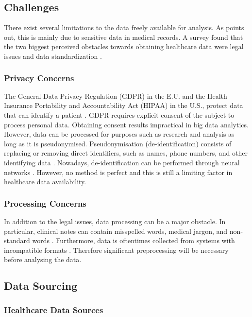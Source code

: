 \documentclass[a4paper,12pt]{article}
\begin{document}
\subsection{Challenges}

There exist several limitations to the data freely available for analysis.
As \textcite[2]{Dalianis2015} points out, this is mainly due to sensitive data
in medical records.
A survey found that the two biggest perceived obstacles towards obtaining
healthcare data were legal issues and data standardization \parencite{Kim2019}.

\subsubsection{Privacy Concerns}

The General Data Privacy Regulation (GDPR) in the E.U. and the Health Insurance
Portability and Accountability Act (HIPAA) in the U.S., protect data that can
identify a patient \parencite{Iyengar2018}.
GDPR requires explicit consent of the subject to process personal data.
Obtaining consent results impractical in big data analytics.
However, data can be processed for purposes such as research and analysis as
long as it is pseudonymised.
Pseudonymisation (de-identification) consists of replacing or removing direct
identifiers, such as names, phone numbers, and other identifying data \parencite{Hintze2018}.
Nowadays, de-identification can be performed through neural networks \parencite{Dernoncourt2016}.
However, no method is perfect and this is still a limiting factor in healthcare
data availability.

\subsubsection{Processing Concerns}

In addition to the legal issues, data processing can be a major obstacle.
In particular, clinical notes can contain misspelled words, medical jargon,
and non-standard words \parencite{Dalianis2015}.
Furthermore, data is oftentimes collected from systems with incompatible formats
\parencite[34]{Consoli2019}.
Therefore significant preprocessing will be necessary before analysing the data.

\subsection{Data Sourcing}

\subsubsection{Healthcare Data Sources}
\end{document}
